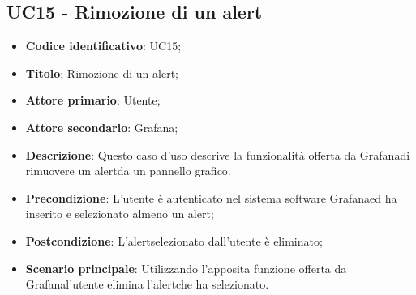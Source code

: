 \subsection{UC15 - Rimozione di un alert}
\begin{itemize}
	\item \textbf{Codice identificativo}: UC15;
	\item \textbf{Titolo}: Rimozione di un alert\glo;
	\item \textbf{Attore primario}: Utente;
	\item \textbf{Attore secondario}: Grafana\glo;
	\item \textbf{Descrizione}: Questo caso d'uso descrive la funzionalità offerta da Grafana\glosp di rimuovere un alert\glosp da un pannello grafico.
	\item \textbf{Precondizione}: L'utente è autenticato nel sistema software Grafana\glosp ed ha inserito e selezionato almeno un alert\glo;
	\item \textbf{Postcondizione}: L'alert\glosp selezionato dall'utente è eliminato;
	\item \textbf{Scenario principale}: Utilizzando l'apposita funzione offerta da Grafana\glosp l'utente elimina l'alert\glosp che ha selezionato.
\end{itemize} 

